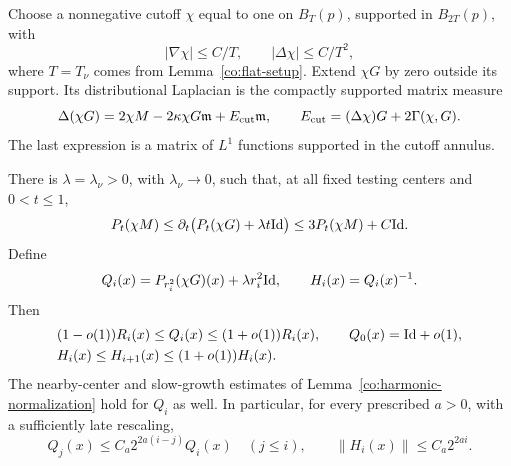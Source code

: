 Choose a nonnegative cutoff \(\chi\) equal to one on \(B_T(p)\),
supported in \(B_{2T}(p)\), with
\[
 |\nabla\chi|\le C/T,\qquad |\Delta\chi|\le C/T^2,
\]
where \(T=T_\nu\) comes from Lemma~\ref{co:flat-setup}.  Extend
\(\chi G\) by zero outside its support.  Its distributional
Laplacian is the compactly supported matrix measure
\begin{equation}\label{co:cutoff-source}
 \Delta(\chi G)=2\chi M-2\kappa\chi G\mathfrak m+E_{\rm cut}\mathfrak m,
 \qquad E_{\rm cut}=(\Delta\chi)G+2\Gamma(\chi,G).
\end{equation}
The last expression is a matrix of \(L^1\) functions supported in
the cutoff annulus.

\begin{lemma}\label{co:heat-matrices}
There is \(\lambda=\lambda_\nu>0\), with \(\lambda_\nu\to0\),
such that, at all fixed testing centers and \(0<t\le1\),
\begin{equation}\label{co:heat-derivative}
 P_t(\chi M)
 \le\partial_t\bigl(P_t(\chi G)+\lambda t\mathrm{Id}\bigr)
 \le 3P_t(\chi M)+C\mathrm{Id}.
\end{equation}
Define
\begin{equation}\label{co:QH-definition}
 Q_i(x)=P_{r_i^2}(\chi G)(x)+\lambda r_i^2\mathrm{Id},
 \qquad H_i(x)=Q_i(x)^{-1}.
\end{equation}
Then
\begin{align}
 &(1-o(1))R_i(x)\le Q_i(x)\le(1+o(1))R_i(x),
       \qquad Q_0(x)=\mathrm{Id}+o(1),\label{co:QR-comparison}\\
 &H_i(x)\le H_{i+1}(x)\le(1+o(1))H_i(x).
       \label{co:H-monotone}
\end{align}
The nearby-center and slow-growth estimates of
Lemma~\ref{co:harmonic-normalization} hold for \(Q_i\) as well.
In particular, for every prescribed \(a>0\), with a sufficiently
late rescaling,
\begin{equation}\label{co:slow-QH}
 Q_j(x)\le C_a2^{2a(i-j)}Q_i(x)\quad(j\le i),
 \qquad \|H_i(x)\|\le C_a2^{2ai}.
\end{equation}
\end{lemma}


